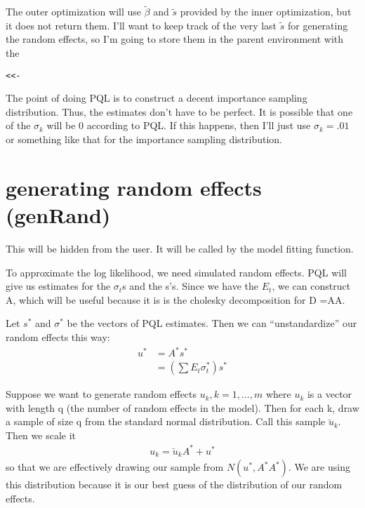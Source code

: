 \documentclass{article}
\begin{document}
The outer optimization will use $\tilde{\beta}$ and $\tilde{s}$ provided by the inner optimization, but it does not return them. I'll want to keep track of the very last  $\tilde{s}$ for generating the random effects, so I'm going to store them in the parent environment with the 
\begin{verbatim}<<- \end{verbatim}


The point of doing PQL is to construct a decent importance sampling distribution. Thus, the estimates don't have to be perfect.  It is possible that one of the $\sigma_k$ will be 0 according to PQL. If this happens, then I'll just use $\sigma_k = .01$ or something like that for the importance sampling distribution.


\section{generating random effects (genRand)}

This will be hidden from the user. It will be called by the model fitting function. 

To approximate the log likelihood, we need simulated random effects.  PQL will give us estimates for the $\sigma_t$s and  the s's. Since we have the $E_t$, we can construct A, which will be useful because it is is the cholesky decomposition for D =AA.

Let $s^*$ and $\sigma^*$ be the vectors of PQL estimates. Then we can ``unstandardize'' our random effects this way:
\begin{align}
u^*&=A^*s^*\\
&= \left(\sum E_t \sigma^*_t \right) s^*
\end{align}

Suppose we want to generate random effects $u_k,k=1,...,m$ where $u_k$ is a vector with length q (the number of random effects in the model). Then for each k, draw a sample of size q from the standard normal distribution. Call this sample $\breve{u}_k$. Then we scale it
\begin{align}
u_k = \breve{u}_k A^* + u^*
\end{align}
so that we are effectively drawing our sample from $N(u^*,A^*A^*)$. We are using this distribution because it is our best guess of the distribution of our random effects.

\end{document}
